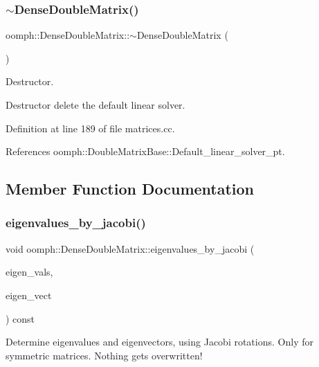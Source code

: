 \subsubsection{\texorpdfstring{$\sim$\+Dense\+Double\+Matrix()}{~DenseDoubleMatrix()}}
{\footnotesize\ttfamily oomph\+::\+Dense\+Double\+Matrix\+::$\sim$\+Dense\+Double\+Matrix (\begin{DoxyParamCaption}{ }\end{DoxyParamCaption})\hspace{0.3cm}{\ttfamily [virtual]}}



Destructor. 

Destructor delete the default linear solver. 

Definition at line 189 of file matrices.\+cc.



References oomph\+::\+Double\+Matrix\+Base\+::\+Default\+\_\+linear\+\_\+solver\+\_\+pt.



\subsection{Member Function Documentation}
\mbox{\label{classoomph_1_1DenseDoubleMatrix_aef56ba05f1ba190c3461cf27d57abd9d}} 
\subsubsection{\texorpdfstring{eigenvalues\+\_\+by\+\_\+jacobi()}{eigenvalues\_by\_jacobi()}}
{\footnotesize\ttfamily void oomph\+::\+Dense\+Double\+Matrix\+::eigenvalues\+\_\+by\+\_\+jacobi (\begin{DoxyParamCaption}\item[{\hyperlink{classoomph_1_1Vector}{Vector}$<$ double $>$ \&}]{eigen\+\_\+vals,  }\item[{\hyperlink{classoomph_1_1DenseMatrix}{Dense\+Matrix}$<$ double $>$ \&}]{eigen\+\_\+vect }\end{DoxyParamCaption}) const}



Determine eigenvalues and eigenvectors, using Jacobi rotations. Only for symmetric matrices. Nothing gets overwritten! 


